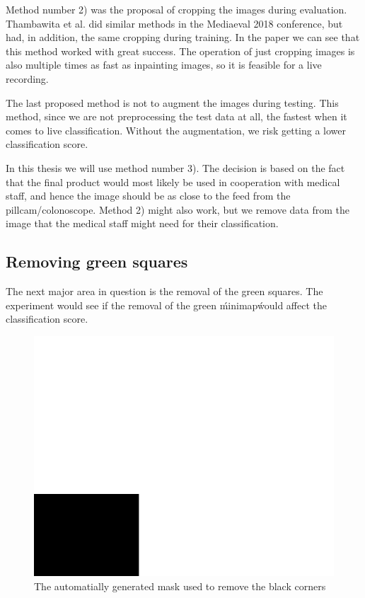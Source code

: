 Method number 2) was the proposal of cropping the images during evaluation.  Thambawita et al. did similar methods in the Mediaeval 2018 conference, but had, in addition, the same cropping during training. In the paper  we can see that this method worked with great success. The operation of just cropping images is also multiple times as fast as inpainting images, so it is feasible for a live recording.  

The last proposed method is not to augment the images during testing. This method, since we are not preprocessing the test data at all, the fastest when it comes to live classification. Without the augmentation, we risk getting a lower classification score.


In this thesis we will use method number 3). The decision is based on the fact that the final product would most likely be used in cooperation with medical staff, and hence the image should be as close to the feed from the pillcam/colonoscope. Method 2) might also work, but we remove data from the image that the medical staff might need for their classification. 

 
\subsection{Removing green squares}
The next major area in question is the removal of the green squares.  The experiment would see if the removal of the green \'minimap\' would affect the classification score. 

\begin{figure}[h]
\centering
\includegraphics[scale=0.3]{experiments/figures/default-green.png}
\caption{The automatially generated mask used to remove the black corners}
\label{fig:corner_mask}
\end{figure}

